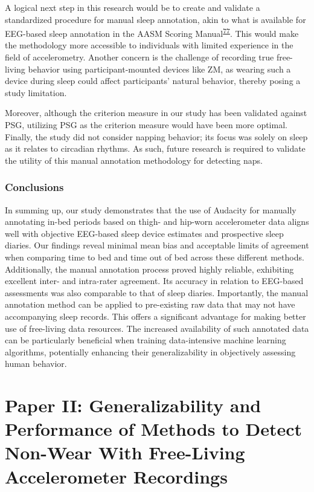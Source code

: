 \documentclass[
  9pt,
]{scrbook}
\begin{document}
A logical next step in this research would be to create and validate a
standardized procedure for manual sleep annotation, akin to what is
available for EEG-based sleep annotation in the AASM Scoring
Manual\textsuperscript{\protect\hyperlink{ref-aasm}{77}}. This would
make the methodology more accessible to individuals with limited
experience in the field of accelerometry. Another concern is the
challenge of recording true free-living behavior using
participant-mounted devices like ZM, as wearing such a device during
sleep could affect participants' natural behavior, thereby posing a
study limitation.

Moreover, although the criterion measure in our study has been validated
against PSG, utilizing PSG as the criterion measure would have been more
optimal. Finally, the study did not consider napping behavior; its focus
was solely on sleep as it relates to circadian rhythms. As such, future
research is required to validate the utility of this manual annotation
methodology for detecting naps.

\hypertarget{conclusions}{%
\subsection{Conclusions}\label{conclusions}}

In summing up, our study demonstrates that the use of Audacity for
manually annotating in-bed periods based on thigh- and hip-worn
accelerometer data aligns well with objective EEG-based sleep device
estimates and prospective sleep diaries. Our findings reveal minimal
mean bias and acceptable limits of agreement when comparing time to bed
and time out of bed across these different methods. Additionally, the
manual annotation process proved highly reliable, exhibiting excellent
inter- and intra-rater agreement. Its accuracy in relation to EEG-based
assessments was also comparable to that of sleep diaries. Importantly,
the manual annotation method can be applied to pre-existing raw data
that may not have accompanying sleep records. This offers a significant
advantage for making better use of free-living data resources. The
increased availability of such annotated data can be particularly
beneficial when training data-intensive machine learning algorithms,
potentially enhancing their generalizability in objectively assessing
human behavior.

\newpage

\hypertarget{paper-ii-generalizability-and-performance-of-methods-to-detect-non-wear-with-free-living-accelerometer-recordings}{%
\chapter{Paper II: Generalizability and Performance of Methods to Detect
Non-Wear With Free-Living Accelerometer
Recordings}\label{paper-ii-generalizability-and-performance-of-methods-to-detect-non-wear-with-free-living-accelerometer-recordings}}
\end{document}

